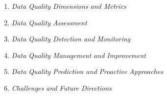 \begin{enumerate}
    \setlength{\itemindent}{3cm}
    \raggedright
    \item \textit{Data Quality Dimensions and Metrics}
    \item \textit{Data Quality Assessment}
    \item \textit{Data Quality Detection and Monitoring}
    \item \textit{Data Quality Management and Improvement}
    \item \textit{Data Quality Prediction and Proactive Approaches}
    \item \textit{Challenges and Future Directions}
\end{enumerate}
